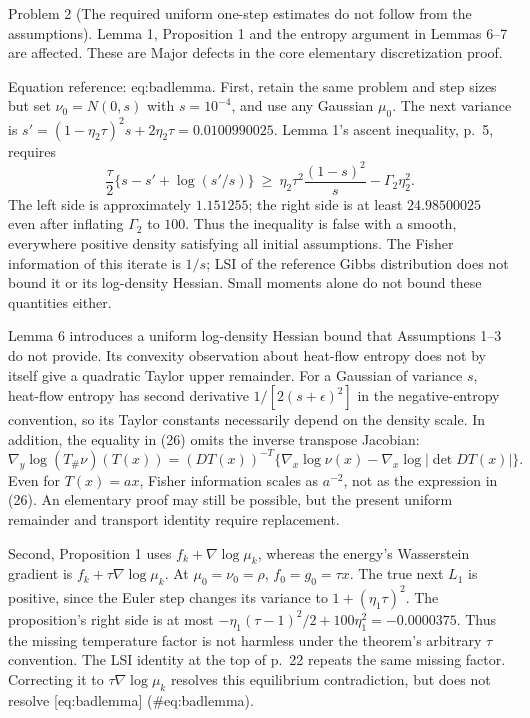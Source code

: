 \documentclass[10pt]{article}
\begin{document}
Problem 2 (The required uniform one-step estimates do not follow from the assumptions).  Lemma 1, Proposition 1 and the entropy argument in Lemmas 6–7 are affected. These are Major defects in the core elementary discretization proof.\par
Equation reference: eq:badlemma. First, retain the same problem and step sizes but set \(\nu_0=N(0,s)\) with \(s=10^{-4}\), and use any Gaussian \(\mu_0\). The next variance is \(s'=(1-\eta_2\tau)^2s+2\eta_2\tau=0.0100990025\). Lemma 1’s ascent inequality, p. 5, requires \[
 \frac{\tau}{2}\{s-s'+\log(s'/s)\}
 \ \geq\ \eta_2\tau^2\frac{(1-s)^2}{s}-\Gamma_2\eta_2^2.\] The left side is approximately \(1.151255\); the right side is at least \(24.98500025\) even after inflating \(\Gamma_2\) to \(100\). Thus the inequality is false with a smooth, everywhere positive density satisfying all initial assumptions. The Fisher information of this iterate is \(1/s\); LSI of the reference Gibbs distribution does not bound it or its log-density Hessian. Small moments alone do not bound these quantities either.\par
Lemma 6 introduces a uniform log-density Hessian bound that Assumptions 1–3 do not provide. Its convexity observation about heat-flow entropy does not by itself give a quadratic Taylor upper remainder. For a Gaussian of variance \(s\), heat-flow entropy has second derivative \(1/[2(s+\epsilon)^2]\) in the negative-entropy convention, so its Taylor constants necessarily depend on the density scale. In addition, the equality in (26) omits the inverse transpose Jacobian: \[\nabla_y\log(T_\#\nu)(T(x))
 =(DT(x))^{-T}\{\nabla_x\log\nu(x)-\nabla_x\log|\det DT(x)|\}.\] Even for \(T(x)=a x\), Fisher information scales as \(a^{-2}\), not as the expression in (26). An elementary proof may still be possible, but the present uniform remainder and transport identity require replacement.\par
Second, Proposition 1 uses \(f_k+\nabla\log\mu_k\), whereas the energy’s Wasserstein gradient is \(f_k+\tau\nabla\log\mu_k\). At \(\mu_0=\nu_0=\rho\), \(f_0=g_0=\tau x\). The true next \(L_1\) is positive, since the Euler step changes its variance to \(1+(\eta_1\tau)^2\). The proposition’s right side is at most \(-\eta_1(\tau-1)^2/2+100\eta_1^2=-0.0000375\). Thus the missing temperature factor is not harmless under the theorem’s arbitrary \(\tau\) convention. The LSI identity at the top of p. 22 repeats the same missing factor. Correcting it to \(\tau\nabla\log\mu_k\) resolves this equilibrium contradiction, but does not resolve [eq:badlemma] (\#eq:badlemma).\par
\end{document}
